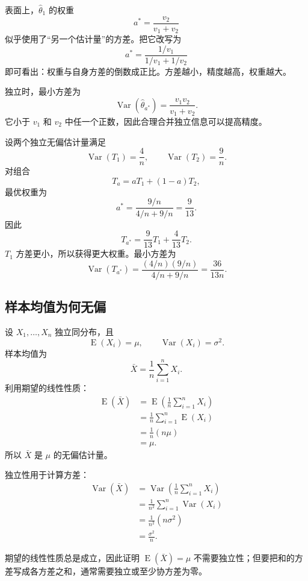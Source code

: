 \documentclass[11pt,a4paper]{article}
\newcommand{\E}{\operatorname{E}}
\newcommand{\Var}{\operatorname{Var}}
\begin{document}
\begin{intuitionbox}
表面上，$\hat\theta_1$ 的权重
\[
  a^*=\frac{v_2}{v_1+v_2}
\]
似乎使用了“另一个估计量”的方差。把它改写为
\[
  a^*
  =
  \frac{1/v_1}{1/v_1+1/v_2}
\]
即可看出：权重与自身方差的倒数成正比。方差越小，精度越高，权重越大。
\end{intuitionbox}

独立时，最小方差为
\[
  \boxed{
  \Var(\hat\theta_{a^*})
  =
  \frac{v_1v_2}{v_1+v_2}.
  }
\]
它小于 $v_1$ 和 $v_2$ 中任一个正数，因此合理合并独立信息可以提高精度。

\begin{examplebox}[最优合并的完整计算]
设两个独立无偏估计量满足
\[
  \Var(T_1)=\frac4n,
  \qquad
  \Var(T_2)=\frac9n.
\]
对组合
\[
  T_a=aT_1+(1-a)T_2,
\]
最优权重为
\[
  a^*
  =
  \frac{9/n}{4/n+9/n}
  =
  \frac9{13}.
\]
因此
\[
  T_{a^*}
  =
  \frac9{13}T_1+\frac4{13}T_2.
\]
$T_1$ 方差更小，所以获得更大权重。最小方差为
\[
  \Var(T_{a^*})
  =
  \frac{(4/n)(9/n)}{4/n+9/n}
  =
  \boxed{\frac{36}{13n}}.
\]
\end{examplebox}

\subsection{样本均值为何无偏}

设 $X_1,\ldots,X_n$ 独立同分布，且
\[
  \E(X_i)=\mu,
  \qquad
  \Var(X_i)=\sigma^2.
\]
样本均值为
\[
  \bar X=\frac1n\sum_{i=1}^nX_i.
\]
利用期望的线性性质：
\[
\begin{aligned}
  \E(\bar X)
  &=
  \E\left(\frac1n\sum_{i=1}^nX_i\right)\\
  &=
  \frac1n\sum_{i=1}^n\E(X_i)\\
  &=
  \frac1n(n\mu)\\
  &=
  \boxed{\mu}.
\end{aligned}
\]
所以 $\bar X$ 是 $\mu$ 的无偏估计量。

独立性用于计算方差：
\[
\begin{aligned}
  \Var(\bar X)
  &=
  \Var\left(\frac1n\sum_{i=1}^nX_i\right)\\
  &=
  \frac1{n^2}\sum_{i=1}^n\Var(X_i)\\
  &=
  \frac1{n^2}(n\sigma^2)\\
  &=
  \boxed{\frac{\sigma^2}{n}}.
\end{aligned}
\]

\begin{conceptbox}[期望计算与方差计算对独立性的需求不同]
期望的线性性质总是成立，因此证明 $\E(\bar X)=\mu$ 不需要独立性；但要把和的方差写成各方差之和，通常需要独立或至少协方差为零。
\end{conceptbox}
\end{document}
